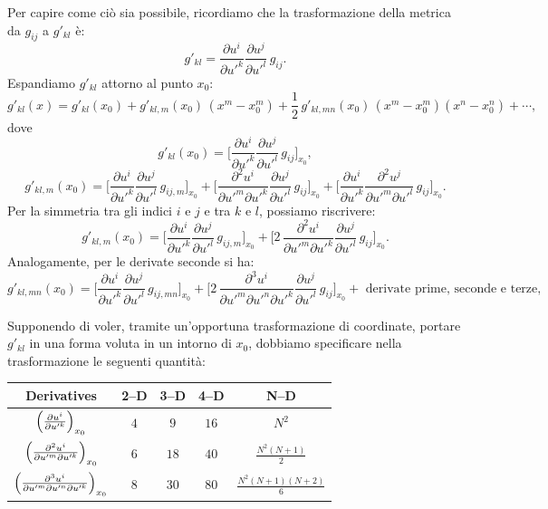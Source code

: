 Per capire come ciò sia possibile, ricordiamo che la trasformazione della metrica da $g_{ij}$ a $g'_{kl}$ è:
$$
g'_{kl} = \frac{\partial u^i}{\partial u'^k} \frac{\partial u^j}{\partial u'^l}\, g_{ij}.
$$
Espandiamo $g'_{kl}$ attorno al punto $x_0$:
$$
g'_{kl}(x) = g'_{kl}(x_0) + g'_{kl,m}(x_0)\,(x^m - x^m_0) + \frac{1}{2}\, g'_{kl,mn}(x_0)\,(x^m - x^m_0)(x^n - x^n_0) + \cdots,
$$
dove
$$
g'_{kl}(x_0) = \Biggl[ \frac{\partial u^i}{\partial u'^k} \frac{\partial u^j}{\partial u'^l}\, g_{ij} \Biggr]_{x_0},
$$
$$
g'_{kl,m}(x_0) = \Biggl[ \frac{\partial u^i}{\partial u'^k} \frac{\partial u^j}{\partial u'^l}\, g_{ij,m} \Biggr]_{x_0} 
+ \Biggl[ \frac{\partial^2 u^i}{\partial u'^m \partial u'^k} \frac{\partial u^j}{\partial u'^l}\, g_{ij} \Biggr]_{x_0}
+ \Biggl[ \frac{\partial u^i}{\partial u'^k} \frac{\partial^2 u^j}{\partial u'^m \partial u'^l}\, g_{ij} \Biggr]_{x_0}.
$$
Per la simmetria tra gli indici $i$ e $j$ e tra $k$ e $l$, possiamo riscrivere:
$$
g'_{kl,m}(x_0) = \Biggl[ \frac{\partial u^i}{\partial u'^k} \frac{\partial u^j}{\partial u'^l}\, g_{ij,m} \Biggr]_{x_0} 
+ \Biggl[ 2\, \frac{\partial^2 u^i}{\partial u'^m \partial u'^k} \frac{\partial u^j}{\partial u'^l}\, g_{ij} \Biggr]_{x_0}.
$$
Analogamente, per le derivate seconde si ha:
$$
g'_{kl,mn}(x_0) = \Biggl[ \frac{\partial u^i}{\partial u'^k} \frac{\partial u^j}{\partial u'^l}\, g_{ij,mn} \Biggr]_{x_0}
+ \Biggl[ 2\, \frac{\partial^3 u^i}{\partial u'^m \partial u'^n \partial u'^k} \frac{\partial u^j}{\partial u'^l}\, g_{ij} \Biggr]_{x_0} + \text{ derivate prime, seconde e terze},
$$

Supponendo di voler, tramite un'opportuna trasformazione di coordinate, portare $g'_{kl}$ in una forma voluta in un intorno di $x_0$, dobbiamo specificare nella trasformazione le seguenti quantità:

\begin{center}
\begin{tabular}{ccccc}
\toprule
\textbf{Derivatives} & \textbf{2--D} & \textbf{3--D} & \textbf{4--D} & \textbf{N--D}\\
\midrule
$\displaystyle \Bigl(\tfrac{\partial u^i}{\partial u'^k}\Bigr)_{x_0}$
  & $4$
  & $9$
  & $16$
  & $N^2$\\
\midrule
$\displaystyle \Bigl(\tfrac{\partial^2 u^i}{\partial u'^m \partial u'^k}\Bigr)_{x_0}$
  & $6$
  & $18$
  & $40$
  & $\displaystyle \tfrac{N^2(N+1)}{2}$\\
\midrule
$\displaystyle \Bigl(\tfrac{\partial^3 u^i}{\partial u'^m \partial u'^n \partial u'^k}\Bigr)_{x_0}$
  & $8$
  & $30$
  & $80$
  & $\displaystyle \tfrac{N^2(N+1)(N+2)}{6}$\\
\bottomrule
\end{tabular}
\end{center}

